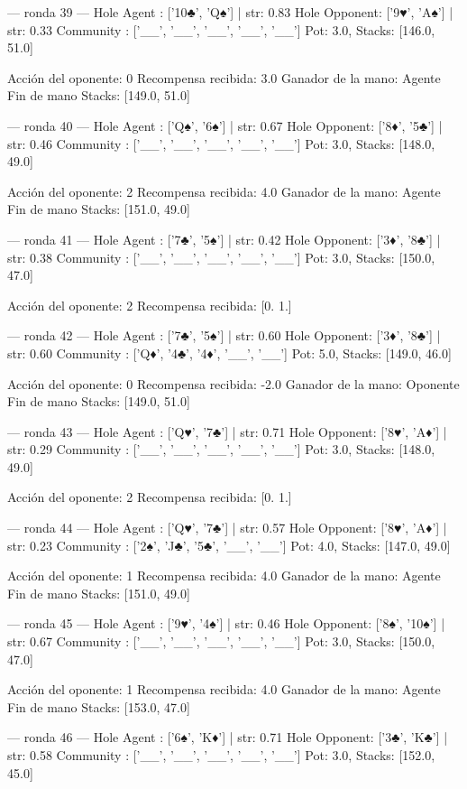 --- ronda 39 ---
Hole Agent : ['10♣', 'Q♠'] | str: 0.83
Hole Opponent: ['9♥', 'A♠'] | str: 0.33
Community  : ['__', '__', '__', '__', '__']
Pot: 3.0, Stacks: [146.0, 51.0]

Acción del oponente: 0
Recompensa recibida: 3.0
Ganador de la mano: Agente
Fin de mano Stacks: [149.0, 51.0]


--- ronda 40 ---
Hole Agent : ['Q♠', '6♠'] | str: 0.67
Hole Opponent: ['8♦', '5♣'] | str: 0.46
Community  : ['__', '__', '__', '__', '__']
Pot: 3.0, Stacks: [148.0, 49.0]

Acción del oponente: 2
Recompensa recibida: 4.0
Ganador de la mano: Agente
Fin de mano Stacks: [151.0, 49.0]


--- ronda 41 ---
Hole Agent : ['7♣', '5♠'] | str: 0.42
Hole Opponent: ['3♦', '8♣'] | str: 0.38
Community  : ['__', '__', '__', '__', '__']
Pot: 3.0, Stacks: [150.0, 47.0]

Acción del oponente: 2
Recompensa recibida: [0. 1.]

--- ronda 42 ---
Hole Agent : ['7♣', '5♠'] | str: 0.60
Hole Opponent: ['3♦', '8♣'] | str: 0.60
Community  : ['Q♦', '4♣', '4♦', '__', '__']
Pot: 5.0, Stacks: [149.0, 46.0]

Acción del oponente: 0
Recompensa recibida: -2.0
Ganador de la mano: Oponente
Fin de mano Stacks: [149.0, 51.0]


--- ronda 43 ---
Hole Agent : ['Q♥', '7♣'] | str: 0.71
Hole Opponent: ['8♥', 'A♦'] | str: 0.29
Community  : ['__', '__', '__', '__', '__']
Pot: 3.0, Stacks: [148.0, 49.0]

Acción del oponente: 2
Recompensa recibida: [0. 1.]

--- ronda 44 ---
Hole Agent : ['Q♥', '7♣'] | str: 0.57
Hole Opponent: ['8♥', 'A♦'] | str: 0.23
Community  : ['2♠', 'J♣', '5♣', '__', '__']
Pot: 4.0, Stacks: [147.0, 49.0]

Acción del oponente: 1
Recompensa recibida: 4.0
Ganador de la mano: Agente
Fin de mano Stacks: [151.0, 49.0]


--- ronda 45 ---
Hole Agent : ['9♥', '4♠'] | str: 0.46
Hole Opponent: ['8♠', '10♠'] | str: 0.67
Community  : ['__', '__', '__', '__', '__']
Pot: 3.0, Stacks: [150.0, 47.0]

Acción del oponente: 1
Recompensa recibida: 4.0
Ganador de la mano: Agente
Fin de mano Stacks: [153.0, 47.0]


--- ronda 46 ---
Hole Agent : ['6♠', 'K♦'] | str: 0.71
Hole Opponent: ['3♣', 'K♣'] | str: 0.58
Community  : ['__', '__', '__', '__', '__']
Pot: 3.0, Stacks: [152.0, 45.0]


